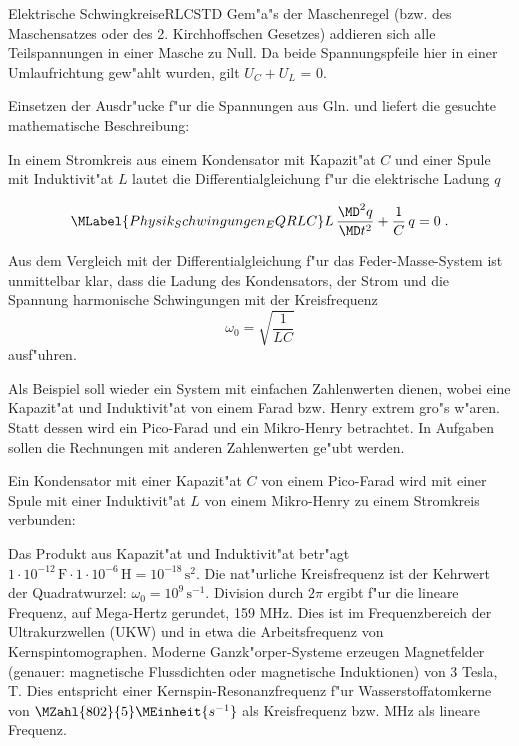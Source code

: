 \begin{MXContent}{Elektrische Schwingkreise}{RLC}{STD}
Gem"a"s der Maschenregel (bzw. des Maschensatzes oder des 2. Kirchhoffschen Gesetzes) addieren sich alle Teilspannungen in einer Masche zu Null. Da beide Spannungspfeile hier in einer Umlaufrichtung gew"ahlt wurden, gilt $U_C+U_L$ = 0.

Einsetzen der Ausdr"ucke f"ur die Spannungen aus Gln.  und  liefert die gesuchte mathematische Beschreibung:

\begin{MInfo}
In einem Stromkreis aus einem Kondensator mit Kapazit"at $C$ und einer Spule mit Induktivit"at $L$ lautet die Differentialgleichung f"ur die elektrische Ladung $q$

\begin{equation}\MLabel{Physik_Schwingungen_EQRLC}
  L\, \frac{\MD^2 q }{\MD t^2} + \frac{1}{C}\, q = 0 \; .
\end{equation}

Aus dem Vergleich mit der Differentialgleichung f"ur das Feder-Masse-System ist unmittelbar klar, dass die Ladung des Kondensators, der Strom und die Spannung harmonische Schwingungen mit der Kreisfrequenz
\begin{equation}
  \omega_0 = \sqrt{\frac{1}{L C}}
\end{equation}
ausf"uhren.
\end{MInfo}

Als Beispiel soll wieder ein System mit einfachen Zahlenwerten dienen, wobei eine Kapazit"at und Induktivit"at von einem Farad bzw. Henry extrem gro"s w"aren. Statt dessen wird ein Pico-Farad und ein Mikro-Henry betrachtet. In Aufgaben sollen die Rechnungen mit anderen Zahlenwerten ge"ubt werden.

\begin{MExample}
Ein Kondensator mit einer Kapazit"at $C$ von einem Pico-Farad wird mit einer Spule mit einer Induktivit"at $L$ von einem Mikro-Henry zu einem Stromkreis verbunden:
\begin{center}
\end{center}
Das Produkt aus Kapazit"at und Induktivit"at betr"agt $1\cdot 10^{-12} \,\text{F}\cdot 1\cdot 10^{-6} \,\text{H} = 10^{-18}\,\text{s}^2$. Die nat"urliche Kreisfrequenz ist der Kehrwert der Quadratwurzel: $\omega_0 = 10^{9}\,\text{s}^{-1}$. Division durch $2\pi$ ergibt f"ur die lineare Frequenz, auf Mega-Hertz gerundet, 159 MHz. Dies ist im Frequenzbereich der Ultrakurzwellen (UKW) und in etwa die Arbeitsfrequenz von Kernspintomographen. Moderne Ganzk"orper-Systeme erzeugen Magnetfelder (genauer: magnetische Flussdichten oder magnetische Induktionen) von 3 Tesla, T. Dies entspricht einer Kernspin-Resonanzfrequenz f"ur Wasserstoffatomkerne von $\MZahl{802}{5} \MEinheit{s^{-1}}$ als Kreisfrequenz bzw.  MHz als lineare Frequenz. 
\end{MExample}


\end{MXContent}
